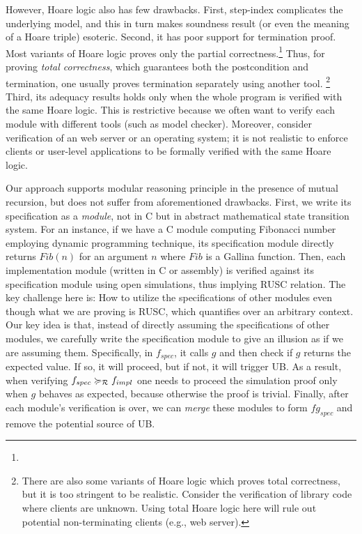 However, Hoare logic also has few drawbacks.
First, step-index complicates the underlying model, and this in turn makes soundness result (or even the meaning of a Hoare triple) esoteric.
Second, it has poor support for termination proof.
Most variants of Hoare logic proves only the partial correctness.\footnote{}
Thus, for proving {\it total correctness}, which guarantees both the postcondition and termination, one usually proves termination separately using another tool.
\footnote{There are also some variants of Hoare logic which proves total correctness, but it is too stringent to be realistic. Consider the verification of library code where clients are unknown.
Using total Hoare logic here will rule out potential non-terminating clients (e.g., web server).}
Third, its adequacy results holds only when the whole program is verified with the same Hoare logic. This is restrictive because we often want to verify each module with different tools (such as model checker).
Moreover, consider verification of an web server or an operating system; it is not realistic to enforce clients or user-level applications to be formally verified with the same Hoare logic.



Our approach supports modular reasoning principle in the presence of mutual recursion, but does not suffer from aforementioned drawbacks.
First, we write its specification as a {\it module}, not in C but in abstract mathematical state transition system. %
For an instance, if we have a C module computing Fibonacci number employing dynamic programming technique, its specification module directly returns $Fib(n)$ for an argument $n$ where $Fib$ is a Gallina function.
Then, each implementation module (written in C or assembly) is verified against its specification module using open simulations, thus implying RUSC relation.
The key challenge here is: How to utilize the specifications of other modules even though what we are proving is RUSC, which quantifies over an arbitrary context.
Our key idea is that, instead of directly assuming the specifications of other modules, we carefully write the specification module to give an illusion as if we are assuming them.
Specifically, in $f_{spec}$, it calls $g$ and then check if $g$ returns the expected value. If so, it will proceed, but if not, it will trigger UB.
As a result, when verifying $f_{spec} \succcurlyeq_{\mathcal{R}} f_{impl}$ one needs to proceed the simulation proof only when $g$ behaves as expected, because otherwise the proof is trivial.
Finally, after each module's verification is over, we can {\it merge} these modules to form $fg_{spec}$ and remove the potential source of UB.

